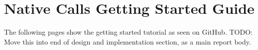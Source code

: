 
\chapter{Native Calls Getting Started Guide}
\label{AppendixA} 

The following pages show the getting started tutorial as seen on GitHub. 
TODO: Move this into end of design and implementation section, as a main report body.


% 